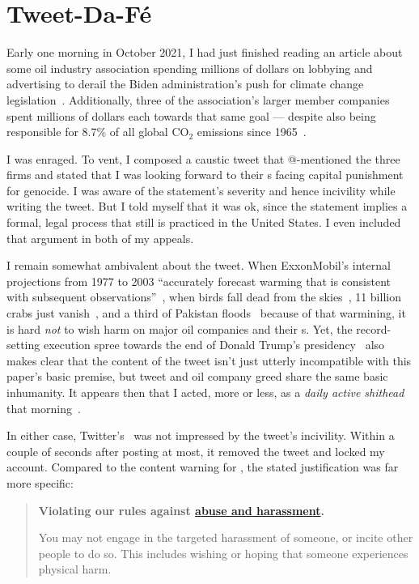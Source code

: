 \section{Tweet-Da-F\'e}
\label{sec:tweet-da-fe}

Early one morning in October 2021, I had just finished reading an article about
some oil industry association spending millions of dollars on lobbying and
advertising to derail the Biden administration's push for climate change
legislation~\cite{Tabuchi2021}. Additionally, three of the association's larger
member companies spent millions of dollars each towards that same goal ---
despite also being responsible for 8.7\% of all global CO$_2$ emissions since
1965~\cite{TaylorWatts2019}.

I was enraged. To vent, I composed a caustic tweet that @-mentioned the three
firms and stated that I was looking forward to their \CEO{}s facing capital
punishment for genocide. I was aware of the statement's severity and hence
incivility while writing the tweet. But I told myself that it was ok, since the
statement implies a formal, legal process that still is practiced in the United
States. I even included that argument in both of my appeals.

I remain somewhat ambivalent about the tweet. When ExxonMobil's internal
projections from 1977 to 2003 ``accurately forecast warming that is consistent
with subsequent observations''~\cite{SupranRahmstorf2023}, when birds fall dead
from the skies~\cite{Dave2022}, 11 billion crabs just
vanish~\cite{Olmstead2022}, and a third of Pakistan floods~\cite{Chughtai2022}
because of that warmining, it is hard \emph{not} to wish harm on major oil
companies and their \CEO{}s. Yet, the record-setting execution spree towards the
end of Donald Trump's
presidency~\cite{Arnsdorf2020,Kovarsky2022,SuebsaengReis2023} also makes clear
that the content of the tweet isn't just utterly incompatible with this paper's
basic premise, but tweet and oil company greed share the same basic inhumanity.
It appears then that I acted, more or less, as a \emph{daily active shithead}
that morning~\cite{Sherman2021}.

In either case, Twitter's \AI\ was not impressed by the tweet's incivility.
Within a couple of seconds after posting at most, it removed the tweet and
locked my account. Compared to the content warning for \DALLE, the stated
justification was far more specific:

\begin{quote}
\openfat\textbf{Violating our rules against
\href{https://web.archive.org/web/20220905021323/https://help.twitter.com/en/rules-and-policies/abusive-behavior}{abuse
and harassment}.}

You may not engage in the targeted harassment of someone, or incite other people
to do so. This includes wishing or hoping that someone experiences physical
harm.\closefat{}
\end{quote}


